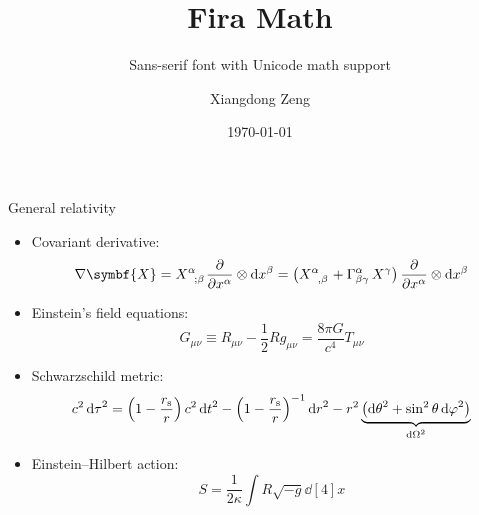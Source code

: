 \documentclass[aspectratio=169]{beamer}
\title{Fira Math}
\subtitle{Sans-serif font with Unicode math support}
\author{Xiangdong Zeng}
\date{\today}
\begin{document}
\maketitle

\begin{frame}{General relativity}
\begin{itemize}
  \item Covariant derivative:
    \[
      \nabla \symbf{X} = \tensor{X}{^\alpha_{;\beta}} \pdv{x^\alpha} \otimes \dd{x^\beta}
                       = \qty(\tensor{X}{^\alpha_{,\beta}} + \Gamma^{\alpha}_{\beta\gamma} \, X^\gamma) \,
                         \pdv{x^\alpha} \otimes \dd{x^\beta}
    \]
  \item Einstein's field equations:
    \[ G_{\mu\nu} \equiv R_{\mu\nu} - \frac{1}{2} R g_{\mu\nu} = \frac{8\pi G}{c^4} T_{\mu\nu} \]
  \item Schwarzschild metric:
    \[
      c^2 \dd{\tau}^2 = \qty(1-\frac{r_{\mathrm{s}}}{r}) \, c^2 \dd{t}^2
                      - \qty(1-\frac{r_{\mathrm{s}}}{r})^{-1} \dd{r}^2
                      - r^2 \underbrace{\qty(\dd{\theta}^2 + \sin^2 \theta \dd{\varphi}^2)}_{\dd{\Omega}^2}
    \]
  \item Einstein--Hilbert action:
    \[ S = \frac{1}{2\kappa} \int R \sqrt{-g} \dd[4]{x} \]
\end{itemize}
\end{frame}
\end{document}
